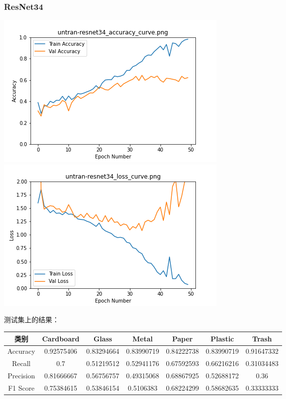 \documentclass[UTF8]{ctexart}
\begin{document}
\subsubsection{ResNet34}
 \includegraphics[scale=0.5]{image/untran-resnet34_accuracy_curve.png} 
\includegraphics[scale=0.5]{image/untran-resnet34_loss_curve.png} 


测试集上的结果：

\begin{tabular}{|c|c|c|c|c|c|c|}
\hline 
类别 & Cardboard & Glass & Metal & Paper & Plastic & Trash \\ 
\hline 
Accuracy &0.92575406& 0.83294664 &0.83990719& 0.84222738& 0.83990719& 0.91647332\\
 \hline 
Recall &0.7    &    0.51219512& 0.52941176& 0.67592593& 0.66216216 &0.31034483\\ 
\hline 
Precision &0.81666667& 0.56756757 &0.49315068& 0.68867925& 0.52688172& 0.36  \\ 
\hline 
F1 Score &0.75384615& 0.53846154& 0.5106383 & 0.68224299& 0.58682635& 0.33333333 \\ 
\hline 
\end{tabular}
\end{document}
